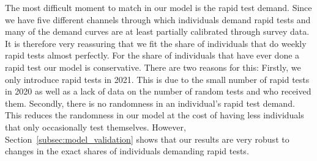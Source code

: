 The most difficult moment to match in our model is the rapid test demand. Since we have
five different channels through which individuals demand rapid tests and many of the
demand curves are at least partially calibrated through survey data. It is therefore very
reassuring that we fit the share of individuals that do weekly rapid tests almost
perfectly. For the share of individuals that have ever done a rapid test our model is
conservative. There are two reasons for this: Firstly, we only introduce rapid tests in
2021. This is due to the small number of rapid tests in 2020 as well as a lack of data on
the number of random tests and who received them. Secondly, there is no randomness in an
individual's rapid test demand. This reduces the randomness in our model at the cost of
having less individuals that only occasionally test themselves.  However,
Section~\ref{subsec:model_validation} shows that our results are very robust to changes
in the exact shares of individuals demanding rapid tests.

